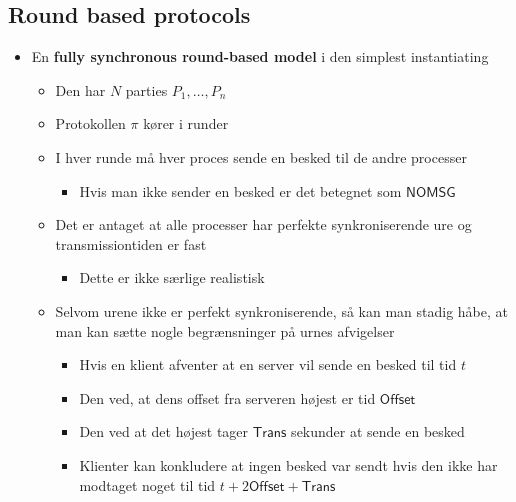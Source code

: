 \documentclass[a4, english]{article}
\begin{document}
\subsection{Round based protocols}
\begin{itemize}
	\item En \textbf{fully synchronous round-based model} i den simplest instantiating
  \begin{itemize}
  	\item Den har $N$ parties $P_1, \dots, P_n$ 
    \item Protokollen $\pi$ kører i runder
    \item I hver runde må hver proces sende en besked til de andre processer
    \begin{itemize}
    	\item Hvis man ikke sender en besked er det betegnet som $\mathsf{NOMSG}$ 
    \end{itemize}
    \item Det er antaget at alle processer har perfekte synkroniserende ure og transmissiontiden er fast
    \begin{itemize}
    	\item Dette er ikke særlige realistisk 
    \end{itemize} 
    \item Selvom urene ikke er perfekt synkroniserende, så kan man stadig håbe, at man kan sætte nogle begrænsninger på urnes afvigelser
    \begin{itemize}
    	\item Hvis en klient afventer at en server vil sende en besked til tid $t$ 
      \item Den ved, at dens offset fra serveren højest er tid $\mathsf{Offset}$
      \item Den ved at det højest tager $\mathsf{Trans}$ sekunder at sende en besked 
      \item Klienter kan konkludere at ingen besked var sendt hvis den ikke har modtaget noget til tid $t+2 \mathsf{Offset} + \mathsf{Trans}$  
    \end{itemize} 
  \end{itemize}


\end{itemize}
\end{document}
